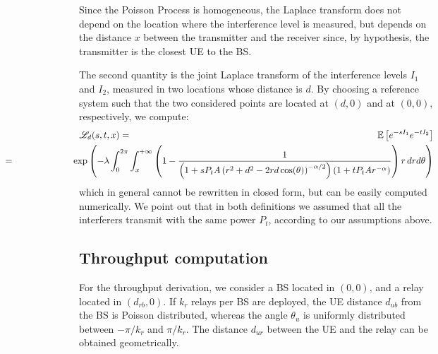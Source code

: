 \documentclass[12pt, letterpaper, onecolumn, draftcls]{IEEEtran}
\begin{document}
Since the Poisson Process is homogeneous, the Laplace transform does not depend on the location where the interference level is measured, but depends on the distance $x$ between the transmitter and the receiver since, by hypothesis, the transmitter is the closest UE to the BS.

The second quantity is the joint Laplace transform of the interference levels $I_1$ and $I_2$, measured in two locations whose distance is $d$. By choosing a reference system such that the two considered points are located at $(d,0)$ and at $(0,0)$, respectively, we compute:
\begin{eqnarray}
 \mathscr{L}_d(s,t,x) & = & \mathbb{E}\left[e^{-sI_1}e^{-tI_2}\right] \nonumber\\
 &\hspace{-4.5cm} = &\hspace{-2.5cm} \exp\left(-\lambda\int_0^{2\pi}\int_x^{+\infty}\left(1-\frac{1}{\left(1+sP_tA\left(r^2+d^2-2rd\cos(\theta)\right)^{-\alpha/2}\right)\left(1+tP_tAr^{-\alpha}\right)}\right)r\,drd\theta\right)
 \label{defLd}
\end{eqnarray}
which in general cannot be rewritten in closed form, but can be easily computed numerically. We point out that in both definitions we assumed that all the interferers transmit with the same power $P_t$, according to our assumptions above.

\subsection{Throughput computation}
For the throughput derivation, we consider a BS located in $(0,0)$, and a relay located in $(d_{rb}, 0)$. If $k_r$ relays per BS are deployed, the UE distance $d_{ub}$ from the BS is Poisson distributed, whereas the angle $\theta_u$ is uniformly distributed between $-\pi/k_r$ and $\pi/k_r$. The distance $d_{ur}$ between the UE and the relay can be obtained geometrically.
\end{document}
